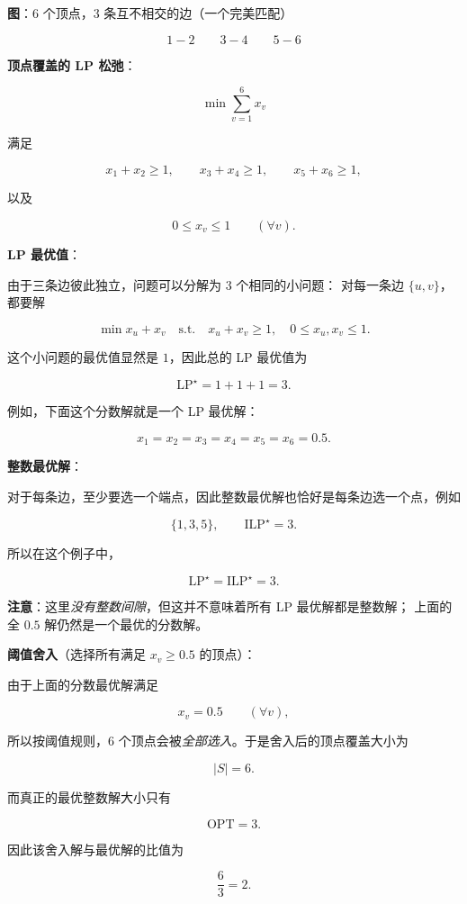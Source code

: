 \documentclass[12pt, a4paper]{ctexart}
\begin{document}
\begin{blackboard}

\textbf{图}：6 个顶点，3 条互不相交的边（一个完美匹配）

$$1 - 2 \qquad 3 - 4 \qquad 5 - 6$$

\textbf{顶点覆盖的 LP 松弛}：

$$
\min \sum_{v=1}^6 x_v
$$

满足

$$
x_1 + x_2 \ge 1,\qquad
x_3 + x_4 \ge 1,\qquad
x_5 + x_6 \ge 1,
$$

以及

$$
0 \le x_v \le 1 \qquad (\forall v).
$$

\textbf{LP 最优值}：

由于三条边彼此独立，问题可以分解为 3 个相同的小问题：
对每一条边 $\{u,v\}$，都要解

$$
\min x_u + x_v
\quad \text{s.t.}\quad
x_u + x_v \ge 1,\quad 0 \le x_u,x_v \le 1.
$$

这个小问题的最优值显然是 $1$，因此总的 LP 最优值为

$$
\mathrm{LP}^\star = 1 + 1 + 1 = 3.
$$

例如，下面这个分数解就是一个 LP 最优解：

$$
x_1 = x_2 = x_3 = x_4 = x_5 = x_6 = 0.5.
$$

\textbf{整数最优解}：

对于每条边，至少要选一个端点，因此整数最优解也恰好是每条边选一个点，例如

$$
\{1,3,5\},
\qquad
\mathrm{ILP}^\star = 3.
$$

所以在这个例子中，

$$
\mathrm{LP}^\star = \mathrm{ILP}^\star = 3.
$$

\textbf{注意}：这里\emph{没有整数间隙}，但这并不意味着所有 LP 最优解都是整数解；
上面的全 $0.5$ 解仍然是一个最优的分数解。

\textbf{阈值舍入}（选择所有满足 $x_v \ge 0.5$ 的顶点）：

由于上面的分数最优解满足

$$
x_v = 0.5 \qquad (\forall v),
$$

所以按阈值规则，6 个顶点会被\emph{全部选入}。于是舍入后的顶点覆盖大小为

$$
|S| = 6.
$$

而真正的最优整数解大小只有

$$
\mathrm{OPT} = 3.
$$

因此该舍入解与最优解的比值为

$$
\frac{6}{3} = 2.
$$


\end{blackboard}
\end{document}
